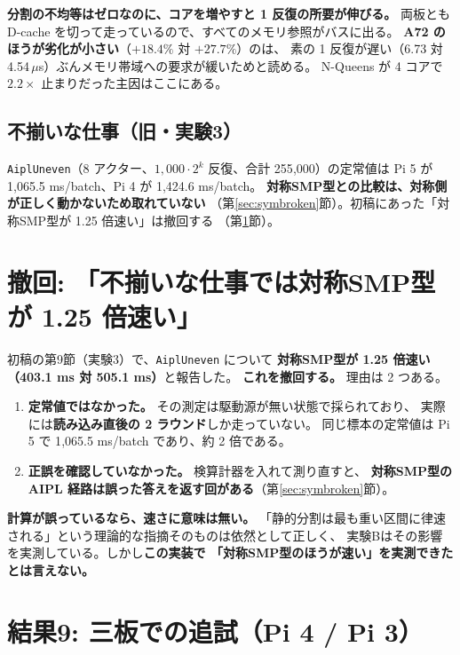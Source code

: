 \documentclass[a4paper,11pt]{ltjsarticle}
\begin{document}
\noindent
\textbf{分割の不均等はゼロなのに、コアを増やすと 1 反復の所要が伸びる。}
両板とも D-cache を切って走っているので、すべてのメモリ参照がバスに出る。
\textbf{A72 のほうが劣化が小さい}（$+18.4\%$ 対 $+27.7\%$）のは、
素の 1 反復が遅い（6.73 対 4.54\,$\mu$s）ぶんメモリ帯域への要求が緩いためと読める。
N-Queens が 4 コアで $2.2\times$ 止まりだった主因はここにある。

\subsection{不揃いな仕事（旧・実験3）}
\texttt{AiplUneven}（8 アクター、$1{,}000\cdot 2^k$ 反復、合計 255{,}000）の定常値は
Pi 5 が 1{,}065.5 ms/batch、Pi 4 が 1{,}424.6 ms/batch。
\textbf{対称SMP型との比較は、対称側が正しく動かないため取れていない}
（第\ref{sec:symbroken}節）。初稿にあった「対称SMP型が 1.25 倍速い」は撤回する
（第\ref{sec:retract}節）。

\section{撤回: 「不揃いな仕事では対称SMP型が 1.25 倍速い」}\label{sec:retract}

初稿の第9節（実験3）で、\texttt{AiplUneven} について
\textbf{対称SMP型が 1.25 倍速い（403.1 ms 対 505.1 ms）}と報告した。
\textbf{これを撤回する。} 理由は 2 つある。

\begin{enumerate}
\item \textbf{定常値ではなかった。} その測定は駆動源が無い状態で採られており、
      実際には\textbf{読み込み直後の 2 ラウンド}しか走っていない。
      同じ標本の定常値は Pi 5 で 1{,}065.5 ms/batch であり、約 2 倍である。
\item \textbf{正誤を確認していなかった。} 検算計器を入れて測り直すと、
      \textbf{対称SMP型の AIPL 経路は誤った答えを返す回がある}（第\ref{sec:symbroken}節）。
\end{enumerate}

\noindent
\textbf{計算が誤っているなら、速さに意味は無い。}
「静的分割は最も重い区間に律速される」という理論的な指摘そのものは依然として正しく、
実験Bはその影響を実測している。しかし\textbf{この実装で
「対称SMP型のほうが速い」を実測できたとは言えない。}


\section{結果9: 三板での追試（Pi 4 / Pi 3）}\label{sec:boards3}
\end{document}
